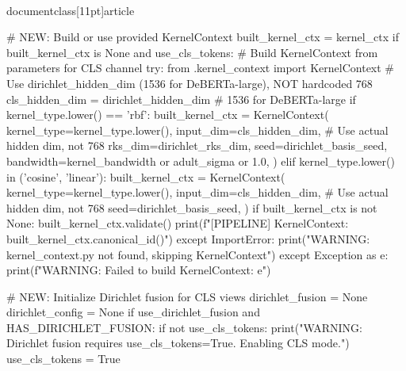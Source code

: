 \\documentclass[11pt]{article}
\begin{document}
\begin{CodeBlock}
    # NEW: Build or use provided KernelContext
    built_kernel_ctx = kernel_ctx
    if built_kernel_ctx is None and use_cls_tokens:
        # Build KernelContext from parameters for CLS channel
        try:
            from .kernel_context import KernelContext
            # Use dirichlet_hidden_dim (1536 for DeBERTa-large), NOT hardcoded 768
            cls_hidden_dim = dirichlet_hidden_dim  # 1536 for DeBERTa-large
            if kernel_type.lower() == 'rbf':
                built_kernel_ctx = KernelContext(
                    kernel_type=kernel_type.lower(),
                    input_dim=cls_hidden_dim,  # Use actual hidden dim, not 768
                    rks_dim=dirichlet_rks_dim,
                    seed=dirichlet_basis_seed,
                    bandwidth=kernel_bandwidth or adult_sigma or 1.0,
                )
            elif kernel_type.lower() in ('cosine', 'linear'):
                built_kernel_ctx = KernelContext(
                    kernel_type=kernel_type.lower(),
                    input_dim=cls_hidden_dim,  # Use actual hidden dim, not 768
                    seed=dirichlet_basis_seed,
                )
            if built_kernel_ctx is not None:
                built_kernel_ctx.validate()
                print(f"[PIPELINE] KernelContext: {built_kernel_ctx.canonical_id()}")
        except ImportError:
            print("WARNING: kernel_context.py not found, skipping KernelContext")
        except Exception as e:
            print(f"WARNING: Failed to build KernelContext: {e}")

    # NEW: Initialize Dirichlet fusion for CLS views
    dirichlet_fusion = None
    dirichlet_config = None
    if use_dirichlet_fusion and HAS_DIRICHLET_FUSION:
        if not use_cls_tokens:
            print("WARNING: Dirichlet fusion requires use_cls_tokens=True. Enabling CLS mode.")
            use_cls_tokens = True
        

\end{CodeBlock}
\end{document}
